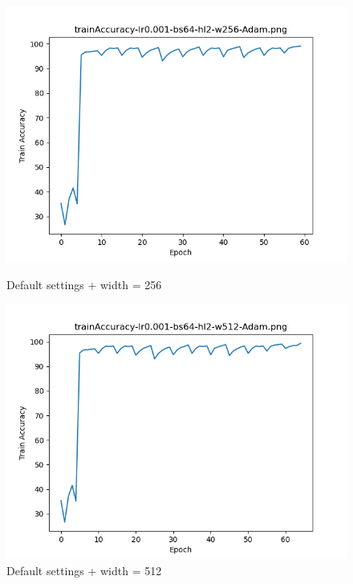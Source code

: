 \documentclass{article}[12pt]
\begin{document}
        \begin{figure}[H]
        \includegraphics[width=\linewidth]{testsResults/trainAccuracy/trainAccuracy-lr0.001-bs64-hl2-w256-Adam.png}
        \caption{Default settings + width = 256}
        \endminipage
        \includegraphics[width=\linewidth]{testsResults/trainAccuracy/trainAccuracy-lr0.001-bs64-hl2-w512-Adam.png}
        \caption{Default settings + width = 512}
        \endminipage
    \end{figure}
\end{document}

